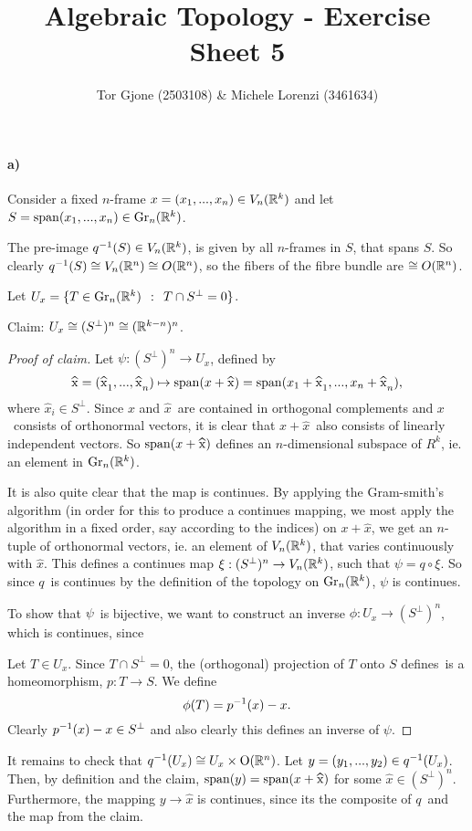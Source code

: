 \documentclass[a4paper,11pt,english]{article}
\title{\textbf{Algebraic Topology} - Exercise Sheet 5}
\author{Tor Gjone (2503108) \& Michele Lorenzi (3461634)}
\newcommand{\orth}{\bot}
\begin{document}
\mmaketitle

\begin{exercise}[1]
\paragraph{a)}
Consider a fixed $n$-frame $x = (x_1, ..., x_n) \in V_n(\mathbb{R}^k)$ and let 
$S = \operatorname{span}(x_1,...,x_n) \in \operatorname{Gr}_n(\mathbb{R}^k)$. 

The pre-image $q^{-1}(S) \in V_n(\mathbb{R}^k)$, is given by all $n$-frames in $S$, that
spans $S$. So clearly $q^{-1}(S) \cong V_n(\mathbb{R}^n) \cong O(\mathbb{R}^n)$, so the fibers of the
fibre bundle are $\cong O(\mathbb{R}^n)$.

Let $U_x = \{ T \in \Gr_n(\R^k) \q: T \cap S^{\orth} = 0 \}$. 

Claim: $U_x \cong (S^\orth)^n \cong (\R^{k-n})^n$.
\begin{proof}[Proof of claim]
Let $\psi: (S^\orth)^n \to U_x$, defined by
\[ \hat x = (\hat x_1, ..., \hat x_n) \mapsto \span(x+\hat x) = \span(x_1 + \hat x_1, ..., x_n + \hat x_n
), \]
where $\hat x_i \in S^{\orth}$. Since $x$ and $\hat x$ are contained in
orthogonal complements and $x$ consists of orthonormal vectors, it is clear that
$x + \hat x$ also consists of linearly independent vectors. So $\span(x+\hat x)$
defines an $n$-dimensional subspace of $R^k$, ie. an element in
$\operatorname{Gr}_n(\mathbb{R}^k)$. 

It is also quite clear that the map is continues. By applying the Gram-smith's
algorithm (in order for this to produce a continues mapping, we most apply the
algorithm in a fixed order, say according to the indices) on $x + \hat x$, we
get an $n$-tuple of orthonormal vectors, ie. an element of $V_n(\mathbb{R}^k)$, that
varies continuously with $\hat x$.
This defines a continues map $\xi: (S^{\orth})^n \to V_n(\R^k)$, such that $\psi
= q \circ \xi$. So since $q$ is continues by the definition of the topology on
$\operatorname{Gr}_n(\mathbb{R}^k)$, $\psi$ is continues.

To show that $\psi$ is bijective, we want to construct an inverse 
$\phi: U_x \to (S^{\orth})^n$, which is continues, since 

Let $T \in U_x$. Since $T \cap S^\orth = 0$, the (orthogonal) projection of $T$ onto
$S$ defines is a homeomorphism, $p: T \to S$. We define 
\[ \phi(T) = p^{-1}(x) - x. \]
Clearly $p\i(x) - x \in S^\orth$ and also clearly this defines an inverse of
$\psi$.
\end{proof}

It remains to check that $q^{-1}(U_x) \cong U_x \times \operatorname{O}(\mathbb{R}^n)$. Let $y = (y_1, ...,
y_2) \in q^{-1}(U_x)$. Then, by definition and the claim, $\span(y) =
\span(x + \hat x)$ for some $\hat x \in (S^{\orth})^n$. Furthermore, the mapping
$y \to \hat x$ is continues, since its the composite of $q$ and the map from the
claim. 


\end{exercise}
\end{document}
